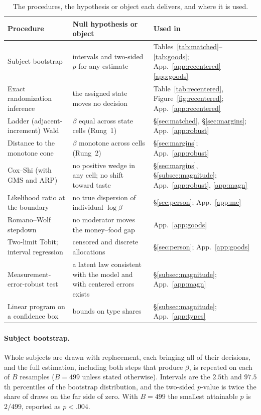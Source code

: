 \documentclass[11pt,a4paper]{article}
\theoremstyle{plain}
\theoremstyle{definition}
\begin{document}
\begin{table}[H]\centering
\caption{The procedures, the hypothesis or object each delivers, and where it is used.}
\label{tab:inference}
{\footnotesize
\renewcommand{\arraystretch}{1.08}
\begin{tabular}{@{}>{\raggedright\arraybackslash}p{4.0cm}>{\raggedright\arraybackslash}p{6.6cm}>{\raggedright\arraybackslash}p{4.4cm}@{}}
\toprule
Procedure & Null hypothesis or object & Used in \\
\midrule
Subject bootstrap & intervals and two-sided $p$ for any estimate & Tables~\ref{tab:matched}--\ref{tab:goods}; App.~\ref{app:recentered}--\ref{app:goods} \\
Exact randomization inference & the assigned state moves no decision & Table~\ref{tab:recentered}, Figure~\ref{fig:recentered}; App.~\ref{app:recentered} \\
Ladder (adjacent-increment) Wald & $\beta$ equal across state cells (Rung~1) & \S\ref{sec:matched}, \S\ref{sec:margins}; App.~\ref{app:robust} \\
Distance to the monotone cone & $\beta$ monotone across cells (Rung~2) & \S\ref{sec:margins}; App.~\ref{app:robust} \\
Cox--Shi (with GMS and ARP) & no positive wedge in any cell; no shift toward taste & \S\ref{sec:margins}, \S\ref{subsec:magnitude}; App.~\ref{app:robust}, \ref{app:magn} \\
Likelihood ratio at the boundary & no true dispersion of individual $\log\beta$ & \S\ref{sec:person}; App.~\ref{app:me} \\
Romano--Wolf stepdown & no moderator moves the money--food gap & App.~\ref{app:goods} \\
Two-limit Tobit; interval regression & censored and discrete allocations & \S\ref{sec:person}; App.~\ref{app:goods} \\
Measurement-error-robust test & a latent law consistent with the model and with centered errors exists & \S\ref{subsec:magnitude}; App.~\ref{app:magn} \\
Linear program on a confidence box & bounds on type shares & \S\ref{subsec:magnitude}; App.~\ref{app:types} \\
\bottomrule
\end{tabular}}
\end{table}

\paragraph{Subject bootstrap.} Whole subjects are drawn with replacement, each bringing all of their decisions, and the
full estimation, including both steps that produce $\beta$, is repeated on each of $B$ resamples ($B=499$ unless stated
otherwise). Intervals are the $2.5$th and $97.5$th percentiles of the bootstrap distribution, and the two-sided
$p$-value is twice the share of draws on the far side of zero. With $B=499$ the smallest attainable $p$ is $2/499$,
reported as $p<.004$.
\end{document}
